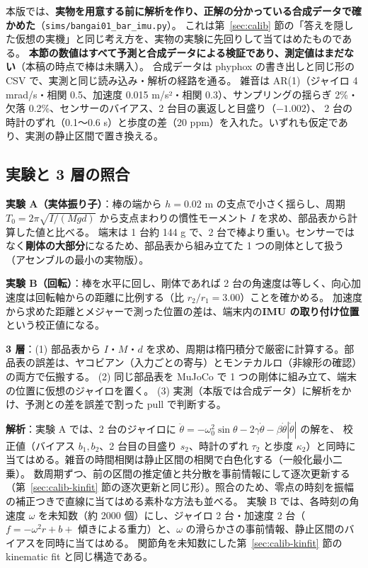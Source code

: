 \documentclass[paper=a4paper,fontsize=10pt,twocolumn,column_gap=2zw,line_length=24zw,number_of_lines=46,head_space=20mm]{jlreq}
\begin{document}
本版では、\textbf{実物を用意する前に解析を作り、正解の分かっている合成データで確かめた}（\texttt{sims/bangai01\_bar\_imu.py}）。
これは第~\ref{sec:calib} 節の「答えを隠した仮想の実機」と同じ考え方を、実物の実験に先回りして当てはめたものである。
\textbf{本節の数値はすべて予測と合成データによる検証であり、測定値はまだない}（本稿の時点で棒は未購入）。
合成データは phyphox の書き出しと同じ形の CSV で、実測と同じ読み込み・解析の経路を通る。
雑音は AR(1)（ジャイロ 4 mrad/s・相関 0.5、加速度 0.015 m/s²・相関 0.3）、サンプリングの揺らぎ 2\%・欠落 0.2\%、センサーのバイアス、2 台目の裏返しと目盛り（$-1.002$）、
2 台の時計のずれ（0.1〜0.6 s）と歩度の差（20 ppm）を入れた。いずれも仮定であり、実測の静止区間で置き換える。

\subsection{実験と 3 層の照合}

\textbf{実験 A（実体振り子）}：棒の端から $h=0.02$ m の支点で小さく揺らし、周期 $T_0=2\pi\sqrt{I/(Mgd)}$ から支点まわりの慣性モーメント $I$ を求め、部品表から計算した値と比べる。
端末は 1 台約 144 g で、2 台で棒より重い。センサーではなく\textbf{剛体の大部分}になるため、部品表から組み立てた 1 つの剛体として扱う（アセンブルの最小の実物版）。

\textbf{実験 B（回転）}：棒を水平に回し、剛体であれば 2 台の角速度は等しく、向心加速度は回転軸からの距離に比例する（比 $r_2/r_1 = 3.00$）ことを確かめる。
加速度から求めた距離とメジャーで測った位置の差は、端末内の\textbf{IMU の取り付け位置}という校正値になる。

\textbf{3 層}：(1) 部品表から $I$・$M$・$d$ を求め、周期は楕円積分で厳密に計算する。部品表の誤差は、ヤコビアン（入力ごとの寄与）とモンテカルロ（非線形の確認）の両方で伝搬する。
(2) 同じ部品表を MuJoCo で 1 つの剛体に組み立て、端末の位置に仮想のジャイロを置く。
(3) 実測（本版では合成データ）に解析をかけ、予測との差を誤差で割った pull で判断する。

\textbf{解析}：実験 A では、2 台のジャイロに $\ddot\theta = -\omega_0^2\sin\theta - 2\gamma\dot\theta - \beta\dot\theta|\dot\theta|$ の解を、
校正値（バイアス $b_1, b_2$、2 台目の目盛り $s_2$、時計のずれ $\tau_2$ と歩度 $\kappa_2$）と同時に当てはめる。雑音の時間相関は静止区間の相関で白色化する（一般化最小二乗）。
数周期ずつ、前の区間の推定値と共分散を事前情報にして逐次更新する（第~\ref{sec:calib-kinfit} 節の逐次更新と同じ形）。照合のため、零点の時刻を振幅の補正つきで直線に当てはめる素朴な方法も並べる。
実験 B では、各時刻の角速度 $\omega$ を未知数（約 2000 個）にし、ジャイロ 2 台・加速度 2 台（$f=-\omega^2 r + b + $ 傾きによる重力）と、$\omega$ の滑らかさの事前情報、静止区間のバイアスを同時に当てはめる。
関節角を未知数にした第~\ref{sec:calib-kinfit} 節の kinematic fit と同じ構造である。
\end{document}
